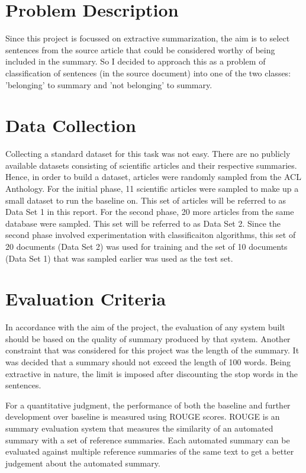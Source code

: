 \section{Problem Description}
Since this project is focussed on extractive summarization, the aim is to select sentences from the source article that could be considered worthy of being included in the summary.
So I decided to approach this as a problem of classification of sentences (in the source document) into one of the two classes: 'belonging' to summary and 'not belonging' to summary.

\section{Data Collection}
Collecting a standard dataset for this task was not easy.
There are no publicly available datasets consisting of scientific articles and their respective summaries.
Hence, in order to build a dataset, articles were randomly sampled from the ACL Anthology.
For the initial phase, 11 scientific articles were sampled to make up a small dataset to run the baseline on.
This set of articles will be referred to as Data Set 1 in this report.
For the second phase, 20 more articles from the same database were sampled.
This set will be referred to as Data Set 2.
Since the second phase involved experimentation with classificaiton algorithms, this set of 20 documents (Data Set 2) was used for training and the set of 10 documents (Data Set 1) that was sampled earlier was used as the test set.

\section{Evaluation Criteria}
In accordance with the aim of the project, the evaluation of any system built should be based on the quality of summary produced by that system.
Another constraint that was considered for this project was the length of the summary.
It was decided that a summary should not exceed the length of 100 words.
Being extractive in nature, the limit is imposed after discounting the stop words in the sentences.

For a quantitative judgment, the performance of both the baseline and further development over baseline is measured using ROUGE scores.
ROUGE \cite{Lin2004} is an summary evaluation system that measures the similarity of an automated summary with a set of reference summaries.
Each automated summary can be evaluated against multiple reference summaries of the same text to get a better judgement about the automated summary.

